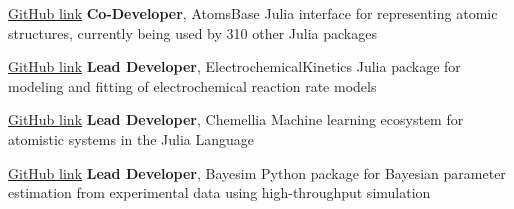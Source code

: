     {\href{https://github.com/https://github.com/JuliaMolSim/AtomsBase.jl}{GitHub link}}
    {\textbf{Co-Developer}, AtomsBase}
    {Julia interface for representing atomic structures, currently being used by 310 other Julia packages}

\vspace{-2mm}
    {\href{https://github.com/BattModels/ElectrochemicalKinetics.jl}{GitHub link}}
    {\textbf{Lead Developer}, ElectrochemicalKinetics}
    {Julia package for modeling and fitting of electrochemical reaction rate models}

\vspace{-2mm}
    {\href{https://github.com/Chemellia}{GitHub link}}
    {\textbf{Lead Developer}, Chemellia}
    {Machine learning ecosystem for atomistic systems in the Julia Language}

\vspace{-2mm}
    {\href{https://github.com/PV-Lab/bayesim}{GitHub link}}
    {\textbf{Lead Developer}, Bayesim}
    {Python package for Bayesian parameter estimation from experimental data using high-throughput simulation}
